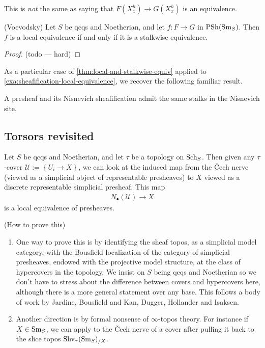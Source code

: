 \documentclass[11pt,openany]{book}
\renewcommand{\Pre}{\mathrm{PSh}}
\begin{document}
\begin{warning} This is \textit{not} the same as saying that $F(X_x^h) \to G(X_x^h)$ is an equivalence.
\end{warning}



\begin{theorem}\label{thm:local-and-stalkwise-equiv} 
(Voevodsky) Let $S$ be qcqs and Noetherian, and let $f \colon F \to G$ in $\Pre(\Sm_S)$. Then $f$ is a local equivalence if and only if it is a stalkwise equivalence.
\end{theorem}
\begin{proof} (todo --- hard)
\end{proof}

As a particular case of \autoref{thm:local-and-stalkwise-equiv} applied to \autoref{exa:sheafification-local-equivalence}, we recover the following familiar result.

\begin{corollary} A presheaf and its Nisnevich sheafification admit the same stalks in the Nisnevich site.
\end{corollary}



\subsection{Torsors revisited}

\begin{proposition} Let $S$ be qcqs and Noetherian, and let $\tau$ be a topology on $\mathrm{Sch}_S$. Then given any $\tau$-cover $\mathcal{U}:=\left\{ U_i \to X \right\}$, we can look at the induced map from the \v{C}ech nerve (viewed as a simplicial object of representable presheaves) to $X$ viewed as a discrete representable simplicial presheaf. This map
\begin{align*}
    N_\bullet(\mathcal{U}) \to X
\end{align*}
is a local equivalence of presheaves.
\end{proposition}

\begin{remark} (How to prove this)
\begin{enumerate}
    \item  One way to prove this is by identifying the sheaf topos, as a simplicial model category, with the Bousfield localization of the category of simplicial presheaves, endowed with the projective model structure, at the class of hypercovers in the topology. We insist on $S$ being qcqs and Noetherian so we don't have to stress about the difference between covers and hypercovers here, although there is a more general statement over any base. This follows a body of work by Jardine, Bousfield and Kan, Dugger, Hollander and Isaksen.
    \item Another direction is by formal nonsense of $\infty$-topos theory. For instance if $X\in \mathrm{Sm}_S$, we can apply \cite[A.5.3.1]{SAG} to the \v{C}ech nerve of a cover after pulling it back to the slice topos $\mathrm{Shv}_{\tau}(\mathrm{Sm}_S)_{/X}$.
\end{enumerate}

\end{remark}
\end{document}
